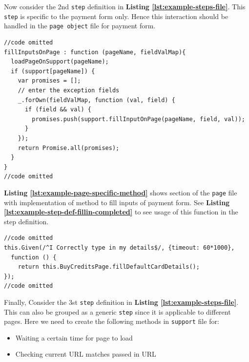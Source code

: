 Now consider the 2nd \texttt{step} definition in \textbf{Listing \ref{lst:example-steps-file}}. This \texttt{step} is specific to the payment form only. Hence this interaction should be handled in the \texttt{page object} file for payment form.

\begin{listing}[H]
\begin{verbatim}
//code omitted
fillInputsOnPage : function (pageName, fieldValMap){
  loadPageOnSupport(pageName);
  if (support[pageName]) {
    var promises = [];
    // enter the exception fields
    _.forOwn(fieldValMap, function (val, field) {
      if (field && val) {
        promises.push(support.fillInputOnPage(pageName, field, val));
      }
    });
    return Promise.all(promises);
  }
}
//code omitted
\end{verbatim}
\label{lst:example-page-specific-method}
\end{listing}

\textbf{Listing \ref{lst:example-page-specific-method}} shows section of the \texttt{page} file with implementation of method to fill inputs of payment form. See \textbf{Listing \ref{lst:example-step-def-fillin-completed}} to see usage of this function in the step definition.

\begin{listing}[H]
\begin{verbatim}
//code omitted
this.Given(/^I Correctly type in my details$/, {timeout: 60*1000},
  function () {
    return this.BuyCreditsPage.fillDefaultCardDetails();
});
//code omitted
\end{verbatim}
\label{lst:example-step-def-fillin-completed}
\end{listing}

Finally, Consider the 3st \texttt{step} definition in \textbf{Listing \ref{lst:example-steps-file}}. This can also be grouped as a generic \texttt{step} since it is applicable to different pages. Here we need to create the following methods in \texttt{support} file for:

\begin{itemize}
\item Waiting a certain time for page to load
\item Checking current URL matches passed in URL
\end{itemize}


